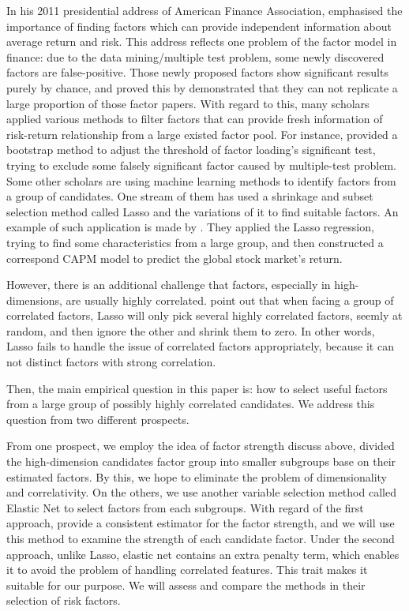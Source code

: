 In his 2011 presidential address of American Finance Association, \citeauthor{Cochrane2011} emphasised the importance of finding factors which can provide independent information about average return and risk.
This address reflects one problem of the factor model in finance: due to the data mining/multiple test problem, some newly discovered factors are false-positive.
Those newly proposed factors show significant results purely by chance, and  proved this by demonstrated that they can not replicate a large proportion of those factor papers.
With regard to this, many scholars applied various methods to filter factors that can provide fresh information of risk-return relationship from a large existed factor pool.
For instance,  provided a bootstrap method to adjust the threshold of factor loading's significant test, trying to exclude some falsely significant factor caused by multiple-test problem.
Some other scholars are using machine learning methods to identify factors from a group of candidates.
One stream of them has used a shrinkage and subset selection method called Lasso \cite{Tibshirani1996} and the variations of it to find suitable factors.
An example of such application is made by .
They applied the Lasso regression, trying to find some characteristics from a large group, and then constructed a correspond CAPM model to predict the global stock market's return.

However, there is an additional challenge that factors, especially in high-dimensions, are usually highly correlated.
 point out that when facing a group of correlated factors, Lasso will only pick several highly correlated factors, seemly at random, and then ignore the other and shrink them to zero. 
In other words, Lasso fails to handle the issue of correlated factors appropriately, because it can not distinct factors with strong correlation.

Then, the main empirical question in this paper is: how to select useful factors from a large group of possibly highly correlated candidates.
We address this question from two different prospects.


From one prospect, we employ the idea of factor strength discuss above, divided the high-dimension candidates factor group into smaller subgroups base on their estimated factors.
By this, we hope to eliminate the problem of dimensionality and correlativity.
On the others, we use another variable selection method called Elastic Net \cite{Zou2005} to select factors from each subgroups.
With regard of the first approach,  provide a consistent estimator for the factor strength, and we will use this method to examine the strength of each candidate factor.
Under the second approach, unlike Lasso, elastic net contains an extra penalty term, which enables it to avoid the problem of handling correlated features.
This trait makes it suitable for our purpose.
We will assess and compare the methods in their selection of risk factors.



